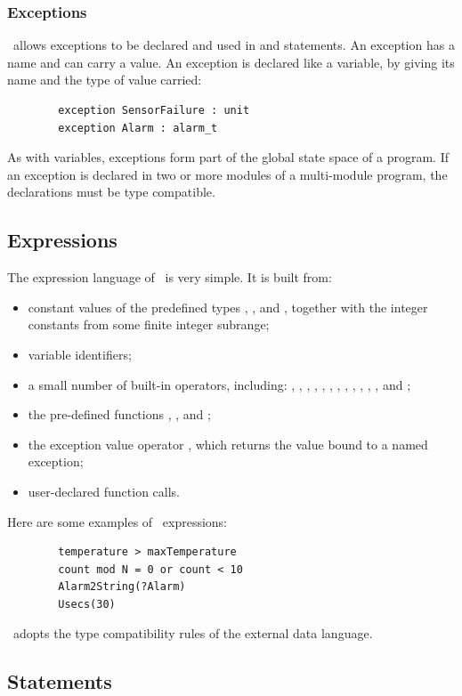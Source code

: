\subsubsection{Exceptions}
\candle\ allows exceptions to be declared and used in 
 and  statements. An exception has a
name and can carry a value. An exception is declared like a variable,
by giving its name and the type of value carried:
\begin{verbatim}
        exception SensorFailure : unit
        exception Alarm : alarm_t
\end{verbatim}
As with variables, exceptions form part of the global state space of a
program. If an exception is declared in two or more modules of a
multi-module program, the declarations must be type compatible.

\subsection{Expressions}
The expression language of \candle\ is very simple. It is built from:
\begin{itemize}
\item constant values of the predefined types , ,
  \trm{\canMsgId} and , together with the integer constants 
  from some finite integer subrange;
\item variable identifiers;
\item a small number of built-in operators, including: , ,
  , \trm{+}, \trm{-}, \trm{*}, \trm{/}, , \trm{=},
  \trm{/=}, \trm{<}, \trm{<=}, \trm{>=} and \trm{>};
\item the pre-defined functions , , 
  and ;
\item the exception value operator , which returns the value
  bound to a named exception;
\item user-declared function calls.
\end{itemize}
Here are some examples of \candle\ expressions:
\begin{verbatim}
        temperature > maxTemperature
        count mod N = 0 or count < 10
        Alarm2String(?Alarm)
        Usecs(30)
\end{verbatim}
\candle\ adopts the type compatibility rules of the external data language.
  
\subsection{Statements}
